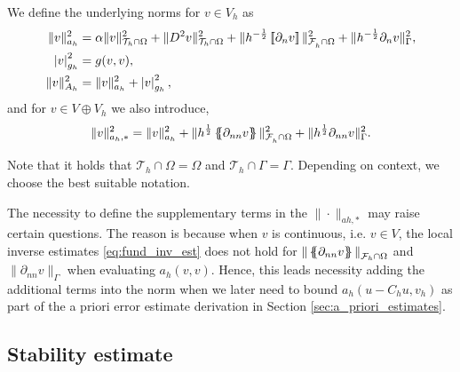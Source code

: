 We define the underlying norms for $ v \in V_{h} $ as
    \begin{align}
        \label{eq:bi_ah_norm}
        \| v \|_{ a_{h} }^{ 2 } & =    \alpha \|   v \|_{ \mathcal{T} _{h} \cap \Omega  }^{ 2}  + \| D^2 v \|_{\mathcal{T} _{h} \cap \Omega   }^{ 2 } +  \| h^{-\frac{1}{2}} \left[\!\left[  \partial _{n} v  \right]\!\right]   \|_{ \mathcal{F}_{h}^{}\cap \Omega    }^{ 2
        } +  \| h^{-\frac{1}{2}}  \partial _{n} v    \|_{ \Gamma   }^{ 2 },    \\
        \label{eq:bi_gh_norm}
\left\lvert  v  \right\rvert _{g_{h}}^{2} & = g( v,v), \\
        \label{eq:bi_Ah_norm}
\| v \|_{A_{h}  }^{  2}  & = \| v \|_{ a_{h} }^{ 2 } + \left\lvert  v  \right\rvert _{g_{h}}^{2}, \\
    \end{align}
and for $v \in V \oplus V_{h}$ we also introduce,
\begin{equation}
    \label{eq:astarnorm}
\| v \|_{ a_{h}, * }^{  2}  =\| v \|_{ a_{h} }^{ 2 } +  \| h^{\frac{1}{2}} \left\{\!\!\left\{ \partial _{nn} v \right\}\!\!\right\}   \|_{\mathcal{F} _{h}^{} \cap \Omega   }^{  2} +  \| h^{\frac{1}{2}} \partial _{nn} v    \|_{ \Gamma }^{  2}.
\end{equation}
\begin{remark}
Note that it holds that $\mathcal{T} _{h} \cap  \Omega   = \Omega  $ and $\mathcal{T} _{h} \cap  \Gamma  = \Gamma $. Depending on context, we choose the best suitable notation.
\end{remark}
\begin{remark}
    The necessity to define the supplementary terms in the $\| \cdot   \|_{a{h},* }^{ } $  may raise certain questions.  The reason is because when $v$ is continuous, i.e. $v \in V$, the local inverse estimates  \ref{eq:fund_inv_est} does not hold for $\| \left\{\!\!\left\{ \partial
    _{nn} v \right\}\!\!\right\}  \|_{ \mathcal{F}_{h} \cap \Omega    }^{  }  $ and  $\|  \partial
    _{nn} v   \|_{ \Gamma }^{  }  $ when evaluating $a_{h}( v, v) $. Hence, this leads necessity adding the additional terms into the norm when we later need to bound $a_{h}( u - C_{h}u, v_{h}) $ as part of the a priori error estimate derivation in Section \ref{sec:a_priori_estimates}.
\end{remark}


\subsection{Stability estimate}%
\label{sub:stability_estimate}


